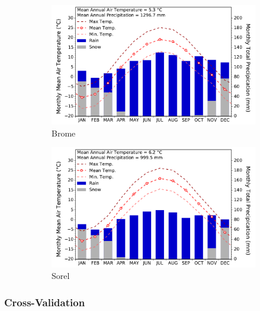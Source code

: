 \documentclass[TechnicalNoteMeteo.tex]{subfiles}
\begin{document}
\begin{figure}[!t]
    \begin{subfigure}{0.475\textwidth}
        \includegraphics[width=\textwidth]{img/weather_normals_brome}
        \caption{Brome}
        \label{subfig:weatherNorm_Brome} 
    \end{subfigure} 
    \hspace{0.04\textwidth}   
    \begin{subfigure}{0.475\textwidth}
        \includegraphics[width=\textwidth]{img/weather_normals_sorel}
        \caption{Sorel}
        \label{subfig:weatherNorm_Sorel}                
    \end{subfigure}
    \caption{}
    \label{fig:weatherNormals}
\end{figure}

\subsubsection{Cross-Validation}
\end{document}
